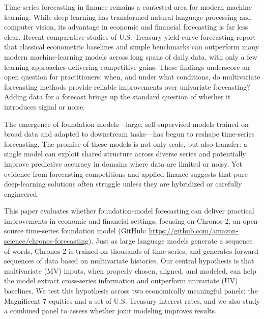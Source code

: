 \documentclass[twocolumn]{article}
\begin{document}
Time-series forecasting in finance remains a contested area for modern machine learning. While deep learning has transformed natural language processing and computer vision, its advantage in economic and financial forecasting is far less clear. Recent comparative studies of U.S. Treasury yield curve forecasting report that classical econometric baselines and simple benchmarks can outperform many modern machine-learning models across long spans of daily data, with only a few learning approaches delivering competitive gains. These findings underscore an open question for practitioners: when, and under what conditions, do multivariate forecasting methods provide reliable improvements over univariate forecasting? Adding data for a forecast brings up the standard question of whether it introduces signal or noise.

The emergence of foundation models---large, self-supervised models trained on broad data and adapted to downstream tasks---has begun to reshape time-series forecasting. The promise of these models is not only scale, but also transfer: a single model can exploit shared structure across diverse series and potentially improve predictive accuracy in domains where data are limited or noisy. Yet evidence from forecasting competitions and applied finance \citep{singh_yield_2025} suggests that pure deep-learning solutions often struggle unless they are hybridized or carefully engineered.

This paper evaluates whether foundation-model forecasting can deliver practical improvements in economic and financial settings, focusing on Chronos-2, an open-source time-series foundation model (GitHub: \url{https://github.com/amazon-science/chronos-forecasting}). Just as large language models generate a sequence of words, Chronos-2 is trained on thousands of time series, and generates forward sequences of data based on multivariate histories. Our central hypothesis is that multivariate (MV) inputs, when properly chosen, aligned, and modeled, can help the model extract cross-series information and outperform univariate (UV) baselines. We test this hypothesis across two economically meaningful panels: the Magnificent-7 equities and a set of U.S. Treasury interest rates, and we also study a combined panel to assess whether joint modeling improves results.
\end{document}
